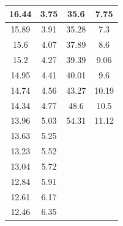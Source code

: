 \documentclass[a4paper, 12pt]{article}%
\begin{document}
\begin{table}[]
\begin{tabular}{|c|c|c|c|}
		16.44                               & 3.75                             & 35.6                               & 7.75                           \\ \hline
		15.89                               & 3.91                             & 35.28                              & 7.3                            \\ \hline
		15.6                                & 4.07                             & 37.89                              & 8.6                            \\ \hline
		15.2                                & 4.27                             & 39.39                              & 9.06                           \\ \hline
		14.95                               & 4.41                             & 40.01                              & 9.6                            \\ \hline
		14.74                               & 4.56                             & 43.27                              & 10.19                          \\ \hline
		14.34                               & 4.77                             & 48.6                               & 10.5                           \\ \hline
		13.96                               & 5.03                             & 54.31                              & 11.12                          \\ \hline
		13.63                               & 5.25                             &                                    &                                \\ \hline
		13.23                               & 5.52                             &                                    &                                \\ \hline
		13.04                               & 5.72                             &                                    &                                \\ \hline
		12.84                               & 5.91                             &                                    &                                \\ \hline
		12.61                               & 6.17                             &                                    &                                \\ \hline
		12.46                               & 6.35                             &                                    &                                \\ \hline

\end{tabular}
\end{table}
\end{document}
